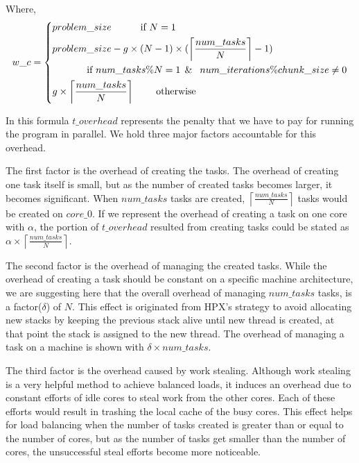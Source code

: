Where, 
\begin{equation}\label{formula2}
w\_c =\left\{
\begin{aligned}
&problem\_{size} \:\:\:\:\:\:\:\:\:\:\:\:\text{ if } N=1\\
&problem\_{size}-g\times{(N-1)}\times(\left \lceil{\frac{num\_{tasks}}{N}}\right \rceil-1) \\
&\:\:\:\:\:\:\:\:\:\:\:\:\:\:\:\:\text{if }num\_{tasks}\%N=1\text{\:\:\&\:\: }num\_{iterations}\%chunk\_{size}\neq0\\ 
&g\times\left \lceil{\frac{num\_{tasks}}{N}}\right \rceil  \:\:\:\:\:\:\:\:\:\:    \text{otherwise}
\end{aligned}
\right.
\end{equation}

In this formula $t\_{overhead}$ represents the penalty that we have to pay for running the program in parallel. We hold three major factors accountable for this overhead. 

The first factor is the overhead of creating the tasks. The overhead of creating one task itself is small, but as the number of created tasks becomes larger, it becomes significant.
When $num\_{tasks}$ tasks are created, $\left\lceil{\frac{num\_{tasks}}{N}}\right \rceil$ tasks would be created on $core\_0$. If we represent the overhead of creating a task on one core with $\alpha$, the portion of $t\_{overhead}$ resulted from creating tasks could be stated as $\alpha\times{\left\lceil{\frac{num\_{tasks}}{N}}\right \rceil}$.

The second factor is the overhead of managing the created tasks. While the overhead of creating a task should be constant on a specific machine architecture, we are suggesting here that the overall overhead of managing $num\_{tasks}$ tasks, is a factor($\delta$) of $N$. This effect is originated from HPX's strategy to avoid allocating new stacks by keeping the previous stack alive until new thread is created, at that point the stack is assigned to the new thread. 
The overhead of managing a task on a machine is shown with $\delta\times{num\_{tasks}}$.

The third factor is the overhead caused by work stealing. Although work stealing is a very helpful method to achieve balanced loads, it induces an overhead due to constant efforts of idle cores to steal work from the other cores. Each of these efforts would result in trashing the local cache of the busy cores. This effect helps for load balancing when the number of tasks created is greater than or equal to the number of cores, but as the number of tasks get smaller than the number of cores, the unsuccessful steal efforts become more noticeable.


